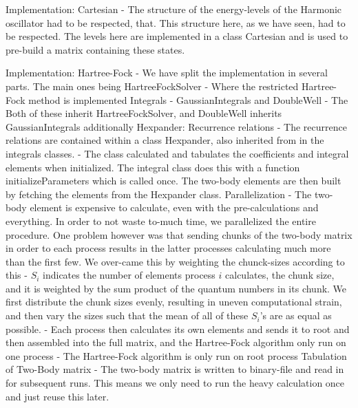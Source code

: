 \documentclass[10pt]{beamer}
\begin{document}
\begin{frame}[fragile]{Implementation: Cartesian}
    - The structure of the energy-levels of the Harmonic oscillator had to be
    respected, that. This structure here, as we have seen, had to be respected.
    The levels here are implemented in a class Cartesian and is used to
    pre-build a matrix containing these states.
\end{frame}

\begin{frame}[fragile]{Implementation: Hartree-Fock}
    - We have split the implementation in several parts. The main ones being
    HartreeFockSolver
        - Where the restricted Hartree-Fock method is implemented
    Integrals
        - GaussianIntegrals and DoubleWell
        - The Both of these inherit HartreeFockSolver, and DoubleWell inherits
        GaussianIntegrals additionally
    Hexpander: Recurrence relations 
        - The recurrence relations are contained within a class Hexpander, also
        inherited from in the integrals classes.
        - The class calculated and tabulates the coefficients and integral
        elements when initialized. The integral class does this with a function
        initializeParameters which is called once. The two-body elements are
        then built by fetching the elements from the Hexpander class.
    Parallelization
        - The two-body element is expensive to calculate, even with the
        pre-calculations and everything. In order to not waste to-much time, we
        parallelized the entire procedure. One problem however was that sending
        chunks of the two-body matrix in order to each process results in the
        latter processes calculating much more than the first few. We over-came
        this by weighting the chunck-sizes according to this
        - $S_i$ indicates the number of elements process $i$ calculates, the
        chunk size, and it is weighted by the sum product of the quantum
        numbers in its chunk. We first distribute the chunk sizes evenly,
        resulting in uneven computational strain, and then vary the sizes such
        that the mean of all of these $S_i$'s are as equal as possible.
        - Each process then calculates its own elements and sends it to root
        and then assembled into the full matrix, and the
        Hartree-Fock algorithm only run on one process
            - The Hartree-Fock algorithm is only run on root process
    Tabulation of Two-Body matrix
        - The two-body matrix is written to binary-file and read in for
        subsequent runs. This means we only need to run the heavy calculation
        once and just reuse this later.
\end{frame}
\end{document}
